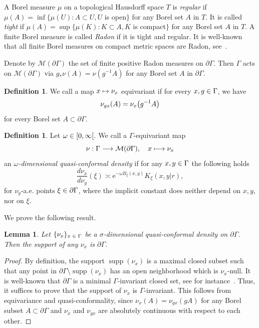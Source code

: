 \documentclass[10pt]{amsart}
\newtheorem{lemm}[theo]{Lemma}\newtheorem{prop}[theo]{Proposition}\newtheorem{coro}[theo]{Corollary}\newtheorem{conj}[theo]{Conjecture}
\theoremstyle{definition}\newtheorem{defi}[theo]{Definition}\newtheorem{rema}[theo]{Remark}\newtheorem{exam}[theo]{Example}\newtheorem{exem}[theo]{Example}\newtheorem{nota}[theo]{Notation}
\newcommand{\pG}{\partial{\Gamma}}
\newcommand{\rme}{\mathrm{e}}
\newcommand{\clM}{\mathcal{M}}
\DeclareMathOperator{\supp}{supp}
\let\originalleft\left
\let\originalright\right
\renewcommand{\left}{\mathopen{}\mathclose\bgroup\originalleft}
\renewcommand{\right}{\aftergroup\egroup\originalright}
\let\oldin\in
\renewcommand{\in}{\mathchoice{\oldin}{\oldin}{\,\oldin\,}{\,\oldin\,}}
\renewcommand*{\to}{\mathchoice{\longrightarrow}{\rightarrow}{\rightarrow}{\rightarrow}}
\let\oldmapsto\mapsto
\renewcommand*{\mapsto}{\mathchoice{\longmapsto}{\oldmapsto}{\oldmapsto}{\oldmapsto}}
\begin{document}
A Borel measure $\mu$ on a topological Hausdorff space $T$ is \emph{regular} if $\mu(A) = \inf\{\mu(U): A \subset U, U$ is open$\}$ for any Borel set $A$ in $T$. It is called \emph{tight} if $\mu(A) =
\sup\{\mu(K): K \subset A, K$ is compact$\}$ for any Borel set $A$ in $T$. A finite Borel measure is called \emph{Radon} if it is tight and regular. It is well-known that all finite Borel measures on compact metric spaces are Radon, see~\cite[Theorem~1.1, Theorem~1.3]{Bill99}.

Denote by $\clM(\pG)$ the set of finite positive Radon measures on $\pG$. Then $\Gamma$ acts on $\clM(\pG)$ via $g_*\nu(A) = \nu(g^{-1}A)$ for any Borel set $A$ in $\pG$.

\begin{defi}
We call a map $x \mapsto \nu_x$ equivariant if for every $x,g\in \Gamma$, we have
\[
\nu_{gx}(A) = \nu_{x}\left(g^{-1}A\right)
\]
for every Borel set $A \subset\pG$.
\end{defi}



\begin{defi}
Let $\omega \in [0, \infty\mathclose{[}$. We call a $\Gamma$-equivariant map
\[
\nu: \Gamma \to
\clM(\pG),\quad x \mapsto \nu_x
\]
an
\emph{$\omega$-dimensional quasi-conformal density} if for any $x, y \in \Gamma$ the following holds
\begin{equation}\label{cdensitydef}
\frac{d\nu_{x}}{d\nu_{y}}(\xi) \asymp \rme^{-\omega B_\xi (x, y)}K_{\xi}(x,y|r),
\end{equation}
for $\nu_y$-a.e. points $\xi \in \pG$, where the implicit constant does neither depend on $x, y$, nor on $\xi$.
\end{defi}



We prove the following result.
\begin{lemm}
Let $\{\nu_x\}_{x\in\Gamma}$ be a $\sigma$-dimensional quasi-conformal density on $\pG$. Then the support of any $\nu_x$ is $\pG$.
\end{lemm}

\begin{proof}
By definition, the support $\supp(\nu_x)$ is a maximal closed subset such that any point in $\pG \setminus \supp(\nu_x)$ has an open neighborhood which is $\nu_x$-null. It is well-known that $\pG$ is a minimal $\Gamma$-invariant closed set, see for instance~\cite[Section~2]{Bo99}. Thus, it suffices to prove that the support of $\nu_x$ is $\Gamma$-invariant. This follows from equivariance and quasi-conformality, since $\nu_x(A)=\nu_{gx}(gA)$ for any Borel subset $A\subset \pG$ and $\nu_x$ and $\nu_{gx}$ are absolutely continuous with respect to each other.
\end{proof}
\end{document}
